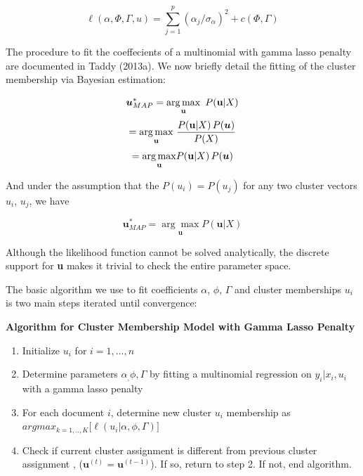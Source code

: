 \documentclass[12pt]{article}
\begin{document}
\begin{equation}
\ell(\alpha,\Phi,\Gamma,u) = \sum_{j=1}^{p}(\alpha_j/ \sigma_\alpha)^2 + c(\Phi,\Gamma) 
\end{equation}


The procedure to fit the coeffecients of a multinomial with gamma lasso penalty are documented in Taddy (2013a). We now briefly detail the fitting of the cluster membership via Bayesian estimation:

\begin{equation}
\boldsymbol{u}^{*}_{MAP}  = \underset{\mathbf{u}}{\arg\max} \, \, \, P( \mathbf{u} | X) \\
\end{equation}
\begin{equation}
= \underset{\mathbf{u}}{\arg\max} \, \, \frac{P( \mathbf{u} | X) \, P(\boldsymbol{u})}{P(X)}    \\
\end{equation}
\begin{equation}
= \underset{\mathbf{u}}{\arg\max} P( \mathbf{u} | X) \, P(\boldsymbol{u})  \\
\end{equation}

And under the assumption that the $P(u_i) = P(u_j)$ for any two cluster vectors $u_i$, $u_j$, we have

\begin{equation}
\boldsymbol{u}^{*}_{MAP} = \underset{\mathbf{u}}{\arg\max} P( \mathbf{u} | X)
\end{equation}


Although the likelihood function cannot be solved analytically, the discrete support for \textbf{u} makes it trivial to check the entire parameter space.


 The basic algorithm we use to fit coefficients $\alpha$, $\phi$, $\Gamma$
and cluster memberships $u_i$ is two main steps iterated until
convergence:

\textbf{Algorithm for Cluster Membership Model with Gamma Lasso Penalty}
\begin{enumerate}
\def\labelenumi{\arabic{enumi}.}
\item
 Initialize $u_i$ for $i = 1, \dots, n$
\item
  Determine parameters $\alpha_, \phi, \Gamma$ by fitting a multinomial
  regression on $y_i | x_i , u_i$ with a gamma lasso penalty
\item
  For each document $i$, determine new cluster $u_i$ membership as \\
  $argmax_{k = 1,..,K} \big[  \ell(u_i| \alpha, \phi, \Gamma) \big]$
\item 
Check if current cluster assignment is different from previous cluster assignment , ($\textbf{u}^{(t)}  = \textbf{u}^{(t-1)}$). If so, return to step 2. If not, end algorithm.
\end{enumerate}
\end{document}
